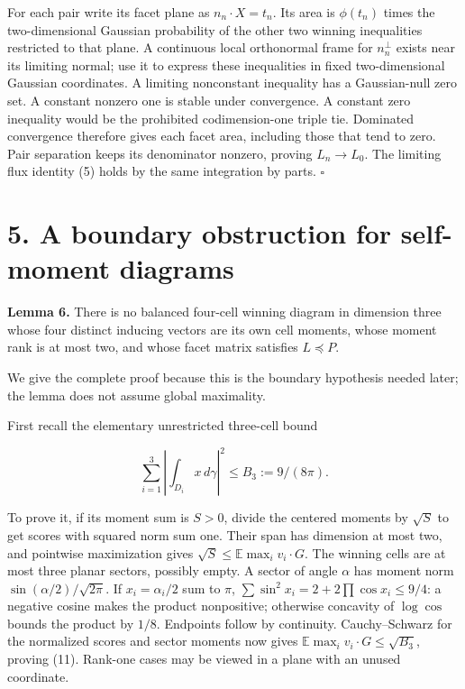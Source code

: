 \documentclass[
  11pt,
]{article}
\begin{document}
For each pair write its facet plane as \(n_n\cdot X=t_n\). Its area is
\(\phi(t_n)\) times the two-dimensional Gaussian probability of the
other two winning inequalities restricted to that plane. A continuous
local orthonormal frame for \(n_n^\perp\) exists near its limiting
normal; use it to express these inequalities in fixed two-dimensional
Gaussian coordinates. A limiting nonconstant inequality has a
Gaussian-null zero set. A constant nonzero one is stable under
convergence. A constant zero inequality would be the prohibited
codimension-one triple tie. Dominated convergence therefore gives each
facet area, including those that tend to zero. Pair separation keeps its
denominator nonzero, proving \(L_n\to L_0\). The limiting flux identity
(5) holds by the same integration by parts. \(\square\)

\section{5. A boundary obstruction for self-moment
diagrams}\label{a-boundary-obstruction-for-self-moment-diagrams}

\textbf{Lemma 6.} There is no balanced four-cell winning diagram in
dimension three whose four distinct inducing vectors are its own cell
moments, whose moment rank is at most two, and whose facet matrix
satisfies \(L\preceq P\).

We give the complete proof because this is the boundary hypothesis
needed later; the lemma does not assume global maximality.

First recall the elementary unrestricted three-cell bound

\[
 \sum_{i=1}^3\left|\int_{D_i}x\,d\gamma\right|^2
                \le B_3:=9/(8\pi).                    \tag{11}
\]

To prove it, if its moment sum is \(S>0\), divide the centered moments
by \(\sqrt S\) to get scores with squared norm sum one. Their span has
dimension at most two, and pointwise maximization gives
\(\sqrt S\le\mathbb E\max_i v_i\cdot G\). The winning cells are at most
three planar sectors, possibly empty. A sector of angle \(\alpha\) has
moment norm \(\sin(\alpha/2)/\sqrt{2\pi}\). If \(x_i=\alpha_i/2\) sum to
\(\pi\), \(\sum\sin^2x_i=2+2\prod\cos x_i\le9/4\): a negative cosine
makes the product nonpositive; otherwise concavity of \(\log\cos\)
bounds the product by \(1/8\). Endpoints follow by continuity.
Cauchy--Schwarz for the normalized scores and sector moments now gives
\(\mathbb E\max_i v_i\cdot G\le\sqrt{B_3}\), proving (11). Rank-one
cases may be viewed in a plane with an unused coordinate.
\end{document}
